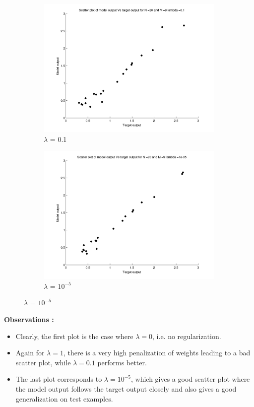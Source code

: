 \documentclass{article}
\begin{document}
\begin{figure}[H]
\begin{subfigure}{.5\textwidth}
\centering
\includegraphics[width=\linewidth]{Scatter_1/Varyinglambda_N20M9lambda01}
\caption{$\lambda$ = 0.1}
\end{subfigure}
\begin{subfigure}{.5\textwidth}
\includegraphics[width=\linewidth]{Scatter_1/Varyinglambda_N20M9lambda1e-05}
\caption{$\lambda$ = $10^{-5}$}
\end{subfigure}



\end{figure}

\textbf{Observations :}
\begin{itemize}
\item Clearly, the first plot is the case where $\lambda = 0$, i.e. no regularization.
\item Again for $\lambda = 1$, there is a very high penalization of weights leading to a bad scatter plot, while $\lambda = 0.1$ performs better.

\item The last plot corresponds to $\lambda = 10^{-5}$, which gives a good scatter plot where the model output follows the target output closely and also gives a good generalization on test examples.
\end{itemize}
\end{document}
